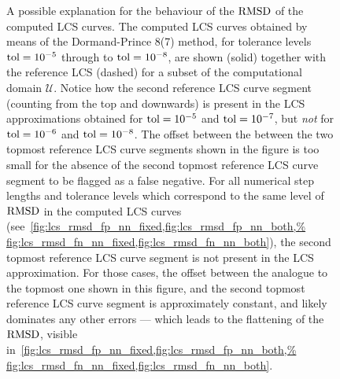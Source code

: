 \begin{figure}[htpb]
    \centering
    
    \caption[A possible explanation for the behaviour of the $\rmsd$ of the
    computed LCS curves]
    {A possible explanation for the behaviour of the
        $\rmsd$ of the computed LCS curves. The computed LCS curves obtained by
        means of the Dormand-Prince 8(7) method, for tolerance levels
        $\textnormal{tol}=10^{-5}$ through to $\textnormal{tol}=10^{-8}$, are shown
        (solid) together with the reference LCS (dashed) for a subset of the
        computational domain $\mathcal{U}$. Notice how the second reference LCS
        curve segment (counting from the top and downwards) is present in the LCS
        approximations obtained for $\textnormal{tol}=10^{-5}$ and
        $\textnormal{tol}=10^{-7}$, but \emph{not} for $\textnormal{tol}=10^{-6}$
    and $\textnormal{tol}=10^{-8}$. The offset between the between the two
topmost reference LCS curve segments shown in the figure is too small for the
absence of the second topmost reference LCS curve segment to be flagged as a
false negative. For all numerical step lengths and tolerance levels which
correspond to the same level of $\rmsd$ in the computed LCS curves
(see~\cref{fig:lcs_rmsd_fp_nn_fixed,fig:lcs_rmsd_fp_nn_both,%
fig:lcs_rmsd_fn_nn_fixed,fig:lcs_rmsd_fn_nn_both}), the second topmost reference
LCS curve segment is not present in the LCS approximation. For those cases,
the offset between the analogue to the topmost one shown in this figure, and
the second topmost reference LCS curve segment is approximately constant, and
likely dominates any other errors --- which leads to the flattening of the
$\rmsd$, visible in~\cref{fig:lcs_rmsd_fp_nn_fixed,fig:lcs_rmsd_fp_nn_both,%
fig:lcs_rmsd_fn_nn_fixed,fig:lcs_rmsd_fn_nn_both}.}
    \label{fig:lcserroroscillations}
\end{figure}

